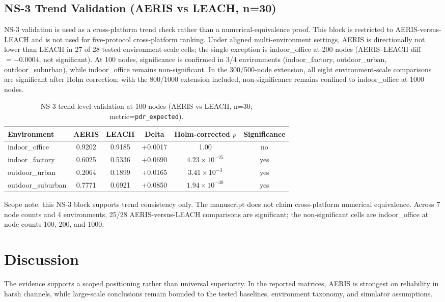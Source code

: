 \documentclass[sensors,article,submit,moreauthors,pdftex]{Definitions/mdpi}
\begin{document}
\subsection{NS-3 Trend Validation (AERIS vs LEACH, n=30)}
NS-3 validation is used as a cross-platform trend check rather than a numerical-equivalence proof. This block is restricted to AERIS-versus-LEACH and is not used for five-protocol cross-platform ranking. Under aligned multi-environment settings, AERIS is directionally not lower than LEACH in 27 of 28 tested environment-scale cells; the single exception is indoor\_office at 200 nodes (AERIS--LEACH diff $=-0.0004$, not significant). At 100 nodes, significance is confirmed in 3/4 environments (indoor\_factory, outdoor\_urban, outdoor\_suburban), while indoor\_office remains non-significant. In the 300/500-node extension, all eight environment-scale comparisons are significant after Holm correction; with the 800/1000 extension included, non-significance remains confined to indoor\_office at 1000 nodes.

\begin{table}[H]
\caption{NS-3 trend-level validation at 100 nodes (AERIS vs LEACH, n=30; metric=\texttt{pdr\_expected}).}
\label{tab:ns3_trend}
\centering
\begin{tabular}{lccccc}
\toprule
Environment & AERIS & LEACH & Delta & Holm-corrected $p$ & Significance \\
\midrule
indoor\_office    & 0.9202 & 0.9185 & +0.0017 & 1.00 & no \\
indoor\_factory   & 0.6025 & 0.5336 & +0.0690 & $4.23\times10^{-25}$ & yes \\
outdoor\_urban    & 0.2064 & 0.1899 & +0.0165 & $3.41\times10^{-3}$ & yes \\
outdoor\_suburban & 0.7771 & 0.6921 & +0.0850 & $1.94\times10^{-30}$ & yes \\
\bottomrule
\end{tabular}
\end{table}

Scope note: this NS-3 block supports trend consistency only. The manuscript does not claim cross-platform numerical equivalence. Across 7 node counts and 4 environments, 25/28 AERIS-versus-LEACH comparisons are significant; the non-significant cells are indoor\_office at node counts 100, 200, and 1000.

\section{Discussion}
The evidence supports a scoped positioning rather than universal superiority. In the reported matrices, AERIS is strongest on reliability in harsh channels, while large-scale conclusions remain bounded to the tested baselines, environment taxonomy, and simulator assumptions.
\end{document}
